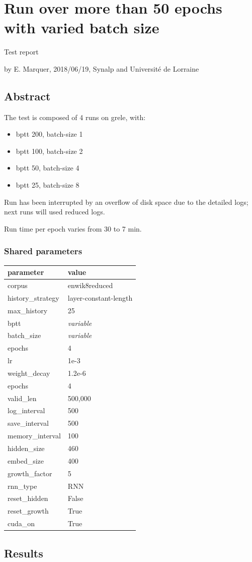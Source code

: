 \section*{Run over more than 50 epochs with varied batch
size}

Test report

by E. Marquer, 2018/06/19, Synalp and Université de Lorraine

\subsection{Abstract}

The test is composed of 4 runs on grele, with:
\begin{itemize}
\item bptt 200, batch-size 1
\item bptt 100, batch-size 2
\item bptt 50, batch-size 4
\item bptt 25, batch-size 8
\end{itemize}

Run has been interrupted by an overflow of disk space due to the
detailed logs; next runs will used reduced logs.

Run time per epoch varies from 30 to 7 min.

\subsubsection{Shared parameters}

\begin{longtable}[]{@{}ll@{}}
\hline
parameter & value\tabularnewline
\hline
\endhead
corpus & enwik8reduced\tabularnewline
history\_strategy & layer-constant-length\tabularnewline
max\_history & 25\tabularnewline
bptt & \emph{variable}\tabularnewline
batch\_size & \emph{variable}\tabularnewline
epochs & 4\tabularnewline
lr & 1e-3\tabularnewline
weight\_decay & 1.2e-6\tabularnewline
epochs & 4\tabularnewline
valid\_len & 500,000\tabularnewline
log\_interval & 500\tabularnewline
save\_interval & 500\tabularnewline
memory\_interval & 100\tabularnewline
hidden\_size & 460\tabularnewline
embed\_size & 400\tabularnewline
growth\_factor & 5\tabularnewline
rnn\_type & RNN\tabularnewline
reset\_hidden & False\tabularnewline
reset\_growth & True\tabularnewline
cuda\_on & True\tabularnewline
\hline
\end{longtable}

\subsection{Results}

